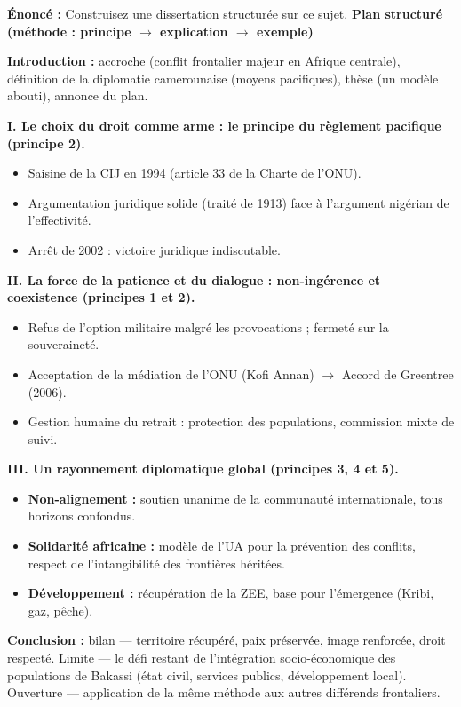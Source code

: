 \documentclass[11pt]{article}
\begin{document}
\begin{exoresolu}
\textbf{Énoncé :} Construisez une dissertation structurée sur ce sujet.
\tcblower
\textbf{Plan structuré (méthode : principe $\rightarrow$ explication $\rightarrow$ exemple)}

\textbf{Introduction :} accroche (conflit frontalier majeur en Afrique centrale), définition de la diplomatie camerounaise (moyens pacifiques), thèse (un modèle abouti), annonce du plan.

\textbf{I. Le choix du droit comme arme : le principe du règlement pacifique (principe 2).}
\begin{itemize}
    \item Saisine de la CIJ en 1994 (article 33 de la Charte de l'ONU).
    \item Argumentation juridique solide (traité de 1913) face à l'argument nigérian de l'effectivité.
    \item Arrêt de 2002 : victoire juridique indiscutable.
\end{itemize}

\textbf{II. La force de la patience et du dialogue : non-ingérence et coexistence (principes 1 et 2).}
\begin{itemize}
    \item Refus de l'option militaire malgré les provocations ; fermeté sur la souveraineté.
    \item Acceptation de la médiation de l'ONU (Kofi Annan) $\rightarrow$ Accord de Greentree (2006).
    \item Gestion humaine du retrait : protection des populations, commission mixte de suivi.
\end{itemize}

\textbf{III. Un rayonnement diplomatique global (principes 3, 4 et 5).}
\begin{itemize}
    \item \textbf{Non-alignement :} soutien unanime de la communauté internationale, tous horizons confondus.
    \item \textbf{Solidarité africaine :} modèle de l'UA pour la prévention des conflits, respect de l'intangibilité des frontières héritées.
    \item \textbf{Développement :} récupération de la ZEE, base pour l'émergence (Kribi, gaz, pêche).
\end{itemize}

\textbf{Conclusion :} bilan — territoire récupéré, paix préservée, image renforcée, droit respecté. Limite — le défi restant de l'intégration socio-économique des populations de Bakassi (état civil, services publics, développement local). Ouverture — application de la même méthode aux autres différends frontaliers.
\end{exoresolu}
\end{document}
